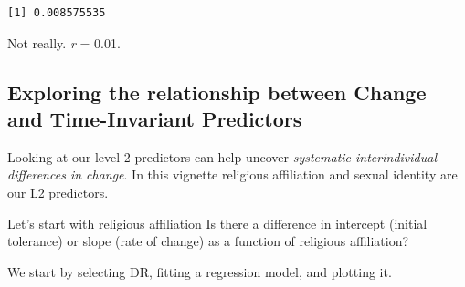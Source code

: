 \documentclass[
  english,
]{book}
\newenvironment{Shaded}{\begin{snugshade}}{\end{snugshade}}
\newcommand{\AttributeTok}[1]{\textcolor[rgb]{0.77,0.63,0.00}{#1}}
\newcommand{\CommentTok}[1]{\textcolor[rgb]{0.56,0.35,0.01}{\textit{#1}}}
\newcommand{\ConstantTok}[1]{\textcolor[rgb]{0.00,0.00,0.00}{#1}}
\newcommand{\ControlFlowTok}[1]{\textcolor[rgb]{0.13,0.29,0.53}{\textbf{#1}}}
\newcommand{\DecValTok}[1]{\textcolor[rgb]{0.00,0.00,0.81}{#1}}
\newcommand{\FunctionTok}[1]{\textcolor[rgb]{0.00,0.00,0.00}{#1}}
\newcommand{\NormalTok}[1]{#1}
\newcommand{\OtherTok}[1]{\textcolor[rgb]{0.56,0.35,0.01}{#1}}
\newcommand{\SpecialCharTok}[1]{\textcolor[rgb]{0.00,0.00,0.00}{#1}}
\newcommand{\StringTok}[1]{\textcolor[rgb]{0.31,0.60,0.02}{#1}}
\begin{document}
\begin{verbatim}
[1] 0.008575535
\end{verbatim}

Not really. \emph{r} = 0.01.

\hypertarget{exploring-the-relationship-between-change-and-time-invariant-predictors}{%
\subsection{Exploring the relationship between Change and Time-Invariant Predictors}\label{exploring-the-relationship-between-change-and-time-invariant-predictors}}

Looking at our level-2 predictors can help uncover \emph{systematic interindividual differences in change}. In this vignette religious affiliation and sexual identity are our L2 predictors.

Let's start with religious affiliation Is there a difference in intercept (initial tolerance) or slope (rate of change) as a function of religious affiliation?

We start by selecting DR, fitting a regression model, and plotting it.

\begin{Shaded}
\end{Shaded}

\begin{Shaded}
\end{Shaded}
\end{document}
